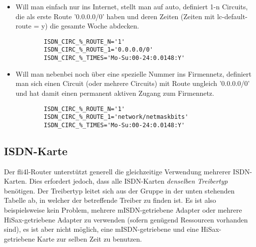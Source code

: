 \begin{itemize}
\item Will man einfach nur ins Internet, stellt man 
auf auto, definiert 1-n Circuits, die als erste Route '0.0.0.0/0' haben
und deren Zeiten (Zeiten mit lc-default-route = y) die gesamte Woche
abdecken.
\begin{small}
\begin{example}
\begin{verbatim}
        ISDN_CIRC_%_ROUTE_N='1'
        ISDN_CIRC_%_ROUTE_1='0.0.0.0/0'
        ISDN_CIRC_%_TIMES='Mo-Su:00-24:0.0148:Y'
\end{verbatim}
\end{example}
\end{small}

\item Will man nebenbei noch über eine spezielle Nummer ins
Firmennetz, definiert man sich einen Circuit (oder mehrere Circuits)
mit Route ungleich '0.0.0.0/0' und hat damit einen permanent aktiven
Zugang zum Firmennetz.
\begin{small}
\begin{example}
\begin{verbatim}
        ISDN_CIRC_%_ROUTE_N='1'
        ISDN_CIRC_%_ROUTE_1='network/netmaskbits'
        ISDN_CIRC_%_TIMES='Mo-Su:00-24:0.0148:Y'
\end{verbatim}
\end{example}
\end{small}
\end{itemize}

\subsection{ISDN-Karte}

Der fli4l-Router unterstützt generell die gleichzeitige Verwendung mehrerer
ISDN-Karten. Dies erfordert jedoch, dass alle ISDN-Karten \emph{denselben
Treibertyp} benötigen. Der Treibertyp leitet sich aus der Gruppe in der unten
stehenden Tabelle ab, in welcher der betreffende Treiber zu finden ist. Es ist
also beispielsweise kein Problem, mehrere mISDN-getriebene Adapter oder mehrere
HiSax-getriebene Adapter zu verwenden (sofern genügend Ressourcen vorhanden
sind), es ist aber nicht möglich, eine mISDN-getriebene und eine
HiSax-getriebene Karte zur selben Zeit zu benutzen.

